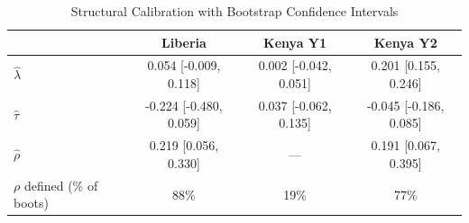 \begin{table}[htbp]
\centering\small
\caption{Structural Calibration with Bootstrap Confidence Intervals}
\label{tab:calib_boot}
\begin{tabular}{lccc}
\toprule
 & Liberia & Kenya Y1 & Kenya Y2 \\
\midrule
$\hat{\lambda}$ & 0.054 [-0.009, 0.118] & 0.002 [-0.042, 0.051] & 0.201 [0.155, 0.246] \\
$\hat{\tau}$ & -0.224 [-0.480, 0.059] & 0.037 [-0.062, 0.135] & -0.045 [-0.186, 0.085] \\
$\hat{\rho}$ & 0.219 [0.056, 0.330] & --- & 0.191 [0.067, 0.395] \\
$\rho$ defined (\% of boots) & 88\% & 19\% & 77\% \\
\bottomrule
\end{tabular}
\par\smallskip{}
\end{table}